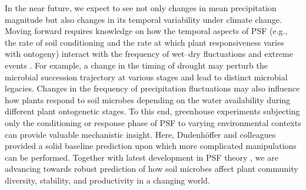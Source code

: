 \documentclass[hidelinks,letterpaper, 11pt]{article}
\begin{document}
In the near future, we expect to see not only changes in mean precipitation magnitude but also changes in its temporal variability under climate change.
Moving forward requires knowledge on how the temporal aspects of PSF (e.g., the rate of soil conditioning and the rate at which plant responsiveness varies with ontogeny) interact with the frequency of wet--dry fluctuations and extreme events \citep{Rudgers2020, Ke2021}. 
For example, a change in the timing of drought may perturb the microbial succession trajectory at various stages and lead to distinct microbial legacies. 
Changes in the frequency of precipitation fluctuations may also influence how plants respond to soil microbes depending on the water availability during different plant ontogenetic stages.
To this end, greenhouse experiments subjecting only the conditioning or response phase of PSF to varying environmental contexts can provide valuable mechanistic insight.
Here, Dudenh{\"o}ffer and colleagues provided a solid baseline prediction upon which more complicated manipulations can be performed.
Together with latest development in PSF theory \citep{Kandlikar2019}, we are advancing towards robust prediction of how soil microbes affect plant community diversity, stability, and productivity in a changing world.
\bigskip
\end{document}
